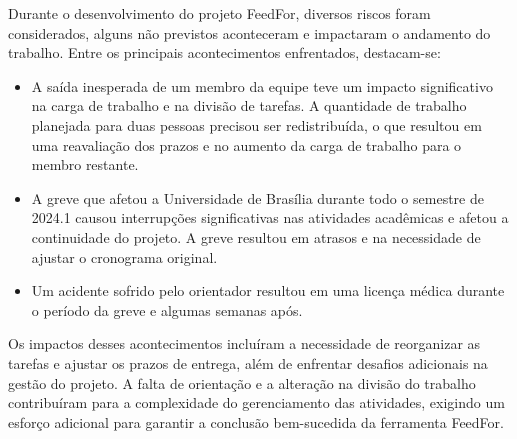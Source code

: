 Durante o desenvolvimento do projeto FeedFor, diversos riscos foram considerados, alguns não previstos aconteceram e impactaram o andamento do trabalho. Entre os principais acontecimentos enfrentados, destacam-se:

\begin{itemize}
    \item A saída inesperada de um membro da equipe teve um impacto significativo na carga de trabalho e na divisão de tarefas. A quantidade de trabalho planejada para duas pessoas precisou ser redistribuída, o que resultou em uma reavaliação dos prazos e no aumento da carga de trabalho para o membro restante.
    \item A greve que afetou a Universidade de Brasília durante todo o semestre de 2024.1 causou interrupções significativas nas atividades acadêmicas e afetou a continuidade do projeto. A greve resultou em atrasos e na necessidade de ajustar o cronograma original.
    \item Um acidente sofrido pelo orientador resultou em uma licença médica durante o período da greve e algumas semanas após.
\end{itemize}

Os impactos desses acontecimentos incluíram a necessidade de reorganizar as tarefas e ajustar os prazos de entrega, além de enfrentar desafios adicionais na gestão do projeto. A falta de orientação e a alteração na divisão do trabalho contribuíram para a complexidade do gerenciamento das atividades, exigindo um esforço adicional para garantir a conclusão bem-sucedida da ferramenta FeedFor.
